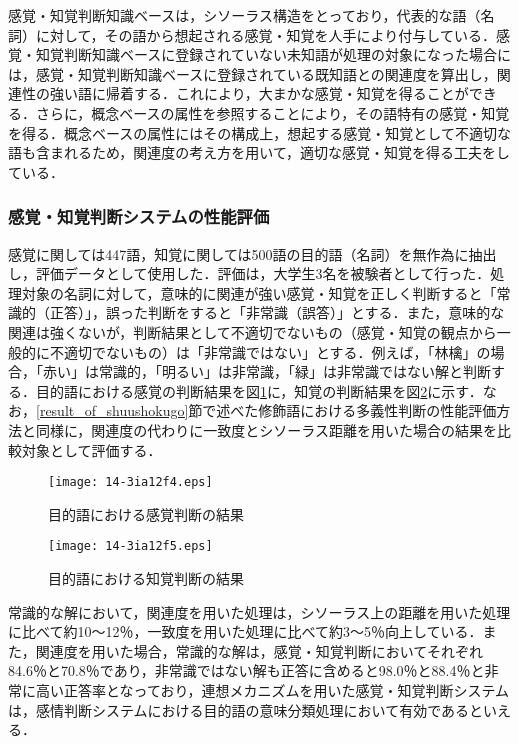 \documentclass[japanese]{jnlp_1.3a}
\begin{document}
感覚・知覚判断知識ベースは，シソーラス構造をとっており，代表的な語（名詞）に対して，その語から想起される感覚・知覚を人手により付与している．感覚・知覚判断知識ベースに登録されていない未知語が処理の対象になった場合には，感覚・知覚判断知識ベースに登録されている既知語との関連度を算出し，関連性の強い語に帰着する．これにより，大まかな感覚・知覚を得ることができる．さらに，概念ベースの属性を参照することにより，その語特有の感覚・知覚を得る．概念ベースの属性にはその構成上，想起する感覚・知覚として不適切な語も含まれるため，関連度の考え方を用いて，適切な感覚・知覚を得る工夫をしている．



\subsubsection{感覚・知覚判断システムの性能評価}
感覚に関しては447語，知覚に関しては500語の目的語（名詞）を無作為に抽出し，評価データとして使用した．評価は，大学生3名を被験者として行った．処理対象の名詞に対して，意味的に関連が強い感覚・知覚を正しく判断すると「常識的（正答）」，誤った判断をすると「非常識（誤答）」とする．また，意味的な関連は強くないが，判断結果として不適切でないもの（感覚・知覚の観点から一般的に不適切でないもの）は「非常識ではない」とする．例えば，「林檎」の場合，「赤い」は常識的，「明るい」は非常識，「緑」は非常識ではない解と判断する．目的語における感覚の判断結果を図\ref{result_of_kannkaku}に，知覚の判断結果を図\ref{result_of_chikaku}に示す．なお，\ref{result_of_shuushokugo}節で述べた修飾語における多義性判断の性能評価方法と同様に，関連度の代わりに一致度とシソーラス距離を用いた場合の結果を比較対象として評価する．

\begin{figure}[b]
\begin{center}
    \texttt{[image: 14-3ia12f4.eps]}
\end{center}
\caption{目的語における感覚判断の結果}
\label{result_of_kannkaku}
\end{figure}

\begin{figure}[t]
\begin{center}
    \texttt{[image: 14-3ia12f5.eps]}
\end{center}
\caption{目的語における知覚判断の結果}
\label{result_of_chikaku}
\end{figure}

常識的な解において，関連度を用いた処理は，シソーラス上の距離を用いた処理に比べて約10〜12{\kern0pt}％，一致度を用いた処理に比べて約3〜5{\kern0pt}％向上している．また，関連度を用いた場合，常識的な解は，感覚・知覚判断においてそれぞれ84.6{\kern0pt}％と70.8{\kern0pt}％であり，非常識ではない解も正答に含めると98.0{\kern0pt}％と88.4{\kern0pt}％と非常に高い正答率となっており，連想メカニズムを用いた感覚・知覚判断システムは，感情判断システムにおける目的語の意味分類処理において有効であるといえる．
\end{document}
